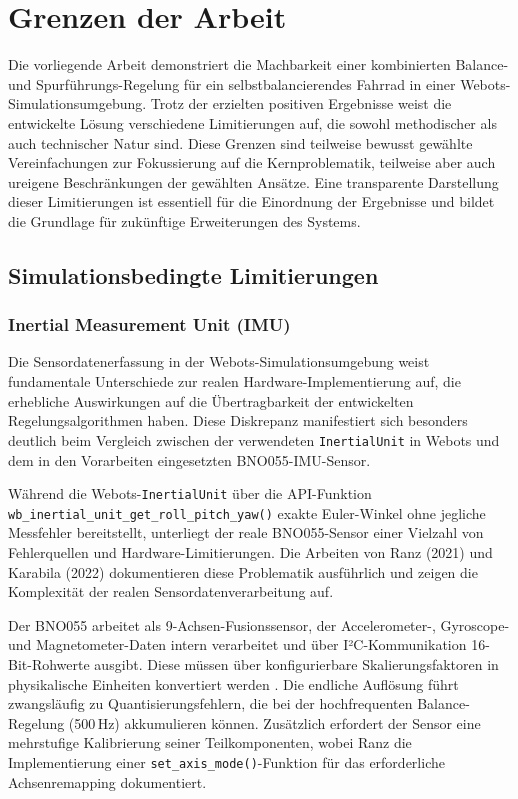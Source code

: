 \section{Grenzen der Arbeit}

Die vorliegende Arbeit demonstriert die Machbarkeit einer kombinierten Balance- und Spurführungs-Regelung für ein 
selbstbalancierendes Fahrrad in einer Webots-Simulationsumgebung. Trotz der erzielten positiven Ergebnisse weist die entwickelte 
Lösung verschiedene Limitierungen auf, die sowohl methodischer als auch technischer Natur sind. Diese Grenzen sind teilweise 
bewusst gewählte Vereinfachungen zur Fokussierung auf die Kernproblematik, teilweise aber auch ureigene Beschränkungen 
der gewählten Ansätze. Eine transparente Darstellung dieser Limitierungen ist essentiell für die Einordnung der Ergebnisse und 
bildet die Grundlage für zukünftige Erweiterungen des Systems.

\subsection{Simulationsbedingte Limitierungen}

\subsubsection{Inertial Measurement Unit (IMU)}
Die Sensordatenerfassung in der Webots-Simulationsumgebung weist fundamentale 
Unterschiede zur realen Hardware-Implementierung auf, die erhebliche Auswirkungen auf die Übertragbarkeit der entwickelten 
Regelungsalgorithmen haben. Diese Diskrepanz manifestiert sich besonders deutlich beim Vergleich zwischen der verwendeten 
\texttt{InertialUnit} in Webots und dem in den Vorarbeiten eingesetzten BNO055-IMU-Sensor.

Während die Webots-\texttt{InertialUnit} über die API-Funktion \texttt{wb\_inertial\_unit\_get\_roll\_pitch\_yaw()} exakte 
Euler-Winkel ohne jegliche Messfehler bereitstellt, unterliegt der reale BNO055-Sensor einer Vielzahl von Fehlerquellen und 
Hardware-Limitierungen. Die Arbeiten von Ranz (2021) und Karabila (2022) dokumentieren diese Problematik ausführlich und 
zeigen die Komplexität der realen Sensordatenverarbeitung auf.

Der BNO055 arbeitet als 9-Achsen-Fusionssensor, der Accelerometer-, Gyroscope- und Magnetometer-Daten intern verarbeitet und 
über I²C-Kommunikation 16-Bit-Rohwerte ausgibt. Diese müssen über konfigurierbare Skalierungsfaktoren in physikalische Einheiten konvertiert werden \citep{ranz2021bachelor}. Die endliche Auflösung führt zwangsläufig 
zu Quantisierungsfehlern, die bei der hochfrequenten Balance-Regelung (500\,Hz) akkumulieren können. Zusätzlich erfordert der Sensor 
eine mehrstufige Kalibrierung seiner Teilkomponenten, wobei Ranz die Implementierung einer \texttt{set\_axis\_mode()}-Funktion für 
das erforderliche Achsenremapping dokumentiert.

